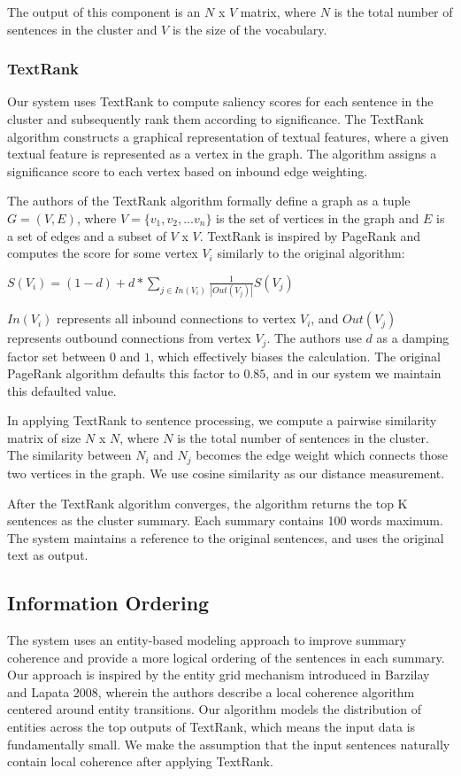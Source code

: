 \documentclass[11pt]{article}
\begin{document}
	The output of this component is an $N$ x $V$ matrix, where $N$ is the total number of sentences in the cluster and $V$ is the size of the vocabulary. 
	\subsubsection{TextRank}
	Our system uses TextRank to compute saliency scores for each sentence in the cluster and subsequently rank them according to significance. The TextRank algorithm constructs a graphical representation of textual features, where a given textual feature is represented as a vertex in the graph. The algorithm assigns a significance score to each vertex based on inbound edge weighting.
	
	The authors of the TextRank algorithm formally define a graph as a tuple $G = (V,E)$, where $V = \{v_1, v_2, ... v_n\}$ is the set of vertices in the graph and $E$ is a set of edges and a subset of $V$ x $V$. TextRank is inspired by PageRank and computes the score for some vertex $V_i$ similarly to the original algorithm:
	\begin{center}
		$S(V_i) = (1 - d) + d * \sum_{j \in In(V_i)} \frac{1}{|Out(V_j)|}S(V_j)$
	\end{center}
	$In(V_i)$ represents all inbound connections to vertex $V_i$, and $Out(V_j)$ represents outbound connections from vertex $V_j$. The authors use $d$ as a damping factor set between $0$ and $1$, which effectively biases the calculation. The original PageRank algorithm defaults this factor to $0.85$, and in our system we maintain this defaulted value.
	
	In applying TextRank to sentence processing, we compute a pairwise similarity matrix of size $N$ x $N$, where $N$ is the total number of sentences in the cluster. The similarity between $N_i$ and $N_j$ becomes the edge weight which connects those two vertices in the graph. We use cosine similarity as our distance measurement.
	
	After the TextRank algorithm converges, the algorithm returns the top K sentences as the cluster summary. Each summary contains 100 words maximum. The system maintains a 
	reference to the original sentences, and uses the original text as output.
	
	\subsection{Information Ordering}
	The system uses an entity-based modeling approach to improve summary coherence and provide a more logical ordering of the sentences in each summary. Our approach is inspired by the entity grid mechanism introduced in Barzilay and Lapata 2008, wherein the authors describe a local coherence algorithm centered around entity transitions. Our algorithm models the distribution of entities across the top outputs of TextRank, which means the input data is fundamentally small. We make the assumption that the input sentences naturally contain local coherence after applying TextRank. 
	
\end{document}
